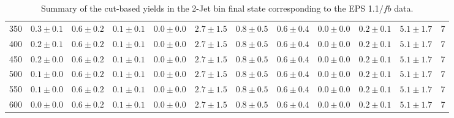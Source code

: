 \begin{table}[!hb]
{\begin{center}
\begin{tabular}{l c c c c c c c c c c c }
350 & $0.3\pm0.1$ & $0.6\pm0.2$ & $0.1\pm0.1$ & $0.0\pm0.0$ & $2.7\pm1.5$ & $0.8\pm0.5$ & $0.6\pm0.4$ & $0.0\pm0.0$ & $0.2\pm0.1$ & $5.1\pm1.7$ & 7 \\
400 & $0.2\pm0.1$ & $0.6\pm0.2$ & $0.1\pm0.1$ & $0.0\pm0.0$ & $2.7\pm1.5$ & $0.8\pm0.5$ & $0.6\pm0.4$ & $0.0\pm0.0$ & $0.2\pm0.1$ & $5.1\pm1.7$ & 7 \\
450 & $0.2\pm0.0$ & $0.6\pm0.2$ & $0.1\pm0.1$ & $0.0\pm0.0$ & $2.7\pm1.5$ & $0.8\pm0.5$ & $0.6\pm0.4$ & $0.0\pm0.0$ & $0.2\pm0.1$ & $5.1\pm1.7$ & 7 \\
500 & $0.1\pm0.0$ & $0.6\pm0.2$ & $0.1\pm0.1$ & $0.0\pm0.0$ & $2.7\pm1.5$ & $0.8\pm0.5$ & $0.6\pm0.4$ & $0.0\pm0.0$ & $0.2\pm0.1$ & $5.1\pm1.7$ & 7 \\
550 & $0.1\pm0.0$ & $0.6\pm0.2$ & $0.1\pm0.1$ & $0.0\pm0.0$ & $2.7\pm1.5$ & $0.8\pm0.5$ & $0.6\pm0.4$ & $0.0\pm0.0$ & $0.2\pm0.1$ & $5.1\pm1.7$ & 7 \\
600 & $0.0\pm0.0$ & $0.6\pm0.2$ & $0.1\pm0.1$ & $0.0\pm0.0$ & $2.7\pm1.5$ & $0.8\pm0.5$ & $0.6\pm0.4$ & $0.0\pm0.0$ & $0.2\pm0.1$ & $5.1\pm1.7$ & 7 \\
\hline
\end{tabular}
\end{center}
}
\caption{Summary of the cut-based yields in the 2-Jet bin final state corresponding to the EPS 1.1$/fb$ data.}
\end{table}
